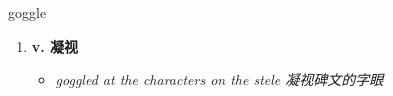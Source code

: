 
\begin{frame}
{\huge goggle}
\begin{center}
\begin{enumerate}\Large
  \item \textbf{v. 凝视}
  \begin{itemize}
    \item \em{\Large{goggled at the characters on the stele 凝视碑文的字眼}}
  \end{itemize}
\end{enumerate}
\end{center}
\end{frame}

